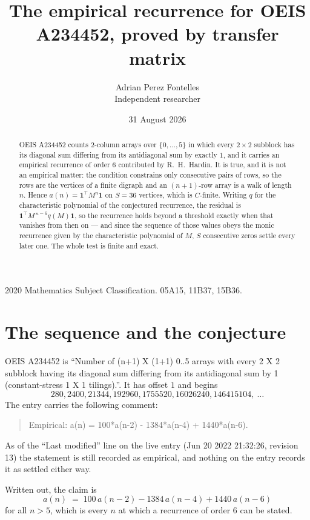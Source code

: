 \documentclass[11pt,a4paper]{article}
\title{The empirical recurrence for OEIS A234452, proved by transfer matrix}
\author{Adrian Perez Fontelles\\ \small Independent researcher}
\date{31 August 2026}
\theoremstyle{plain}
\theoremstyle{definition}
\begin{document}
\maketitle

\begin{abstract}
OEIS A234452 counts $2$-column arrays over $\{0,\dots,5\}$ in which every
$2\times2$ subblock has its diagonal sum differing from its antidiagonal sum by
exactly $1$, and it
carries an empirical recurrence of order $6$ contributed by R.~H.~Hardin. It is true,
and it is not an empirical matter: the condition constrains only consecutive pairs of rows,
so the rows are the vertices of a finite digraph and an $(n+1)$-row array is a walk of
length $n$. Hence $a(n)=\mathbf{1}^{\!\top}M^{n}\mathbf{1}$ on $S=36$ vertices, which
is $C$-finite. Writing $q$ for the characteristic polynomial of the conjectured recurrence,
the residual is $\mathbf{1}^{\!\top}M^{\,n-6}q(M)\mathbf{1}$, so the recurrence
holds beyond a threshold exactly when that vanishes from then on --- and since the sequence
of those values obeys the monic recurrence given by the characteristic polynomial of $M$,
$S$ consecutive zeros settle every later one. The whole test is finite and exact.
\end{abstract}

\noindent\small 2020 Mathematics Subject Classification. 05A15, 11B37, 15B36.\normalsize

\section{The sequence and the conjecture}

OEIS A234452 is ``Number of (n+1) X (1+1) 0..5 arrays with every 2 X 2 subblock having its diagonal sum differing from its antidiagonal sum by 1 (constant-stress 1 X 1 tilings).''. It has offset
$1$ and begins
\[
280, 2400, 21344, 192960, 1755520, 16026240, 146415104,\ \dots
\]
The entry carries the following comment:
\begin{quote}\small
Empirical: a(n) = 100*a(n-2) - 1384*a(n-4) + 1440*a(n-6).
\end{quote}
As of the ``Last modified'' line on the live entry (Jun 20 2022 21:32:26, revision 13) the statement is
still recorded as empirical, and nothing on the entry records it as settled either way.

Written out, the claim is
\begin{equation}\label{eq:conj}
a(n)\;=\;100\,a(n-2) - 1384\,a(n-4) + 1440\,a(n-6)
\end{equation}
for all $n>5$, which is every $n$ at which a recurrence of order $6$ can be
stated.
\end{document}
